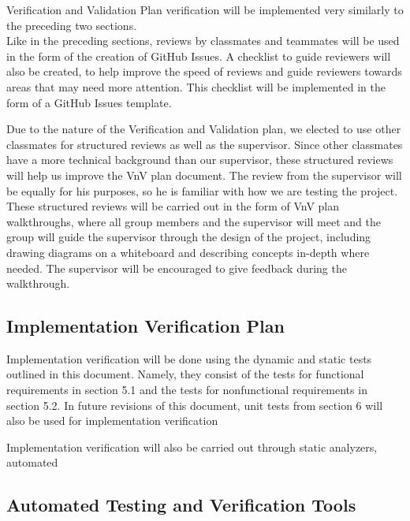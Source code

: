 \documentclass[12pt, titlepage]{article}
\begin{document}
Verification and Validation Plan verification will be implemented very similarly to the preceding two sections. \\
Like in the preceding sections, reviews by classmates and teammates will be used in the form of the creation of GitHub Issues. A checklist to guide reviewers will also be created, to help improve the speed of reviews and guide reviewers towards areas that may need more attention. This checklist will be implemented in the form of a GitHub Issues template.

Due to the nature of the Verification and Validation plan, we elected to use other classmates for structured reviews as well as the supervisor. Since other classmates have a more technical background than our supervisor, these structured reviews will help us improve the VnV plan document. The review from the supervisor will be equally for his purposes, so he is familiar with how we are testing the project. These structured reviews will be carried out in the form of VnV plan walkthroughs, where all group members and the supervisor will meet and the group will guide the supervisor through the design of the project, including drawing diagrams on a whiteboard and describing concepts in-depth where needed. The supervisor will be encouraged to give feedback during the walkthrough.

\subsection{Implementation Verification Plan}


  Implementation verification will be done using the dynamic and static tests outlined in this document. Namely, they consist of the tests for functional requirements in section 5.1 and the tests for nonfunctional requirements in section 5.2. In future revisions of this document, unit tests from section 6 will also be used for implementation verification
  
  Implementation verification will also be carried out through static analyzers, automated 

\subsection{Automated Testing and Verification Tools}
\end{document}
